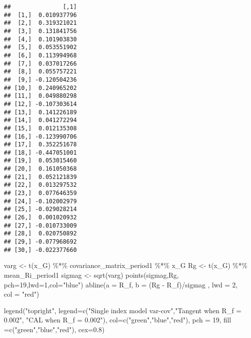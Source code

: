 \documentclass[
]{article}
\newenvironment{Shaded}{\begin{snugshade}}{\end{snugshade}}
\newcommand{\AttributeTok}[1]{\textcolor[rgb]{0.77,0.63,0.00}{#1}}
\newcommand{\DecValTok}[1]{\textcolor[rgb]{0.00,0.00,0.81}{#1}}
\newcommand{\FloatTok}[1]{\textcolor[rgb]{0.00,0.00,0.81}{#1}}
\newcommand{\FunctionTok}[1]{\textcolor[rgb]{0.00,0.00,0.00}{#1}}
\newcommand{\NormalTok}[1]{#1}
\newcommand{\OtherTok}[1]{\textcolor[rgb]{0.56,0.35,0.01}{#1}}
\newcommand{\SpecialCharTok}[1]{\textcolor[rgb]{0.00,0.00,0.00}{#1}}
\newcommand{\StringTok}[1]{\textcolor[rgb]{0.31,0.60,0.02}{#1}}
\begin{document}
\begin{verbatim}
##               [,1]
##  [1,]  0.010937796
##  [2,]  0.319321021
##  [3,]  0.131841756
##  [4,]  0.101903830
##  [5,]  0.053551902
##  [6,]  0.113994968
##  [7,]  0.037017266
##  [8,]  0.055757221
##  [9,] -0.120504236
## [10,]  0.240965202
## [11,]  0.049880298
## [12,] -0.107303614
## [13,]  0.141226189
## [14,]  0.041272294
## [15,]  0.012135308
## [16,] -0.123990706
## [17,]  0.352251678
## [18,] -0.447051001
## [19,]  0.053015460
## [20,]  0.161050368
## [21,]  0.052121839
## [22,]  0.013297532
## [23,]  0.077646359
## [24,] -0.102002979
## [25,] -0.029028214
## [26,]  0.001020932
## [27,] -0.010733009
## [28,]  0.020750892
## [29,] -0.077968692
## [30,] -0.022377660
\end{verbatim}

\begin{Shaded}
\begin{Highlighting}[]
\NormalTok{varg }\OtherTok{\textless{}{-}} \FunctionTok{t}\NormalTok{(x\_G) }\SpecialCharTok{\%*\%}\NormalTok{ covariance\_matrix\_period1 }\SpecialCharTok{\%*\%}\NormalTok{ x\_G }
\NormalTok{Rg }\OtherTok{\textless{}{-}} \FunctionTok{t}\NormalTok{(x\_G) }\SpecialCharTok{\%*\%}\NormalTok{ mean\_Ri\_period1 }
\NormalTok{sigmag }\OtherTok{\textless{}{-}} \FunctionTok{sqrt}\NormalTok{(varg)}
\FunctionTok{points}\NormalTok{(sigmag,Rg, }\AttributeTok{pch=}\DecValTok{19}\NormalTok{,}\AttributeTok{lwd=}\DecValTok{1}\NormalTok{,}\AttributeTok{col=}\StringTok{"blue"}\NormalTok{)}
\FunctionTok{abline}\NormalTok{(}\AttributeTok{a =}\NormalTok{ R\_f, }\AttributeTok{b =}\NormalTok{ (Rg }\SpecialCharTok{{-}}\NormalTok{ R\_f)}\SpecialCharTok{/}\NormalTok{sigmag , }\AttributeTok{lwd =} \DecValTok{2}\NormalTok{, }\AttributeTok{col =} \StringTok{"red"}\NormalTok{)}


\FunctionTok{legend}\NormalTok{(}\StringTok{"topright"}\NormalTok{, }
       \AttributeTok{legend=}\FunctionTok{c}\NormalTok{(}\StringTok{"Single index model var{-}cov"}\NormalTok{,}\StringTok{"Tangent when R\_f = 0.002"}\NormalTok{, }\StringTok{"CAL when R\_f = 0.002"}\NormalTok{),}
       \AttributeTok{col=}\FunctionTok{c}\NormalTok{(}\StringTok{"green"}\NormalTok{,}\StringTok{"blue"}\NormalTok{,}\StringTok{"red"}\NormalTok{),}
       \AttributeTok{pch =} \DecValTok{19}\NormalTok{,}
       \AttributeTok{fill =}\FunctionTok{c}\NormalTok{(}\StringTok{"green"}\NormalTok{,}\StringTok{"blue"}\NormalTok{,}\StringTok{"red"}\NormalTok{),}
       \AttributeTok{cex=}\FloatTok{0.8}\NormalTok{)}
\end{Highlighting}
\end{Shaded}
\end{document}
